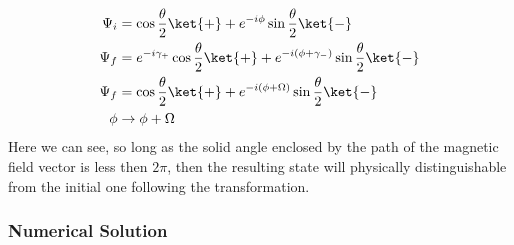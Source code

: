 \documentclass{article}
\begin{document}
\begin{align*}
  \Psi_i &= \cos \frac{\theta}{2} \ket{+} + e^{-i\phi}\sin \frac{\theta}{2}\ket{-}\\
  \Psi_f &= e^{-i\gamma_{+}}\cos \frac{\theta}{2} \ket{+} + e^{-i(\phi + \gamma_{-})}\sin \frac{\theta}{2}\ket{-}\\
  \Psi_f &= \cos \frac{\theta}{2} \ket{+} + e^{-i(\phi + \Omega)}\sin \frac{\theta}{2}\ket{-}\\
  \phi &\rightarrow \phi + \Omega
\end{align*}
Here we can see, so long as the solid angle enclosed by the path of the magnetic field vector is less then $2\pi$, then the resulting state will physically distinguishable from the initial one following the transformation.\\

\subsubsection{Numerical Solution}
\end{document}

